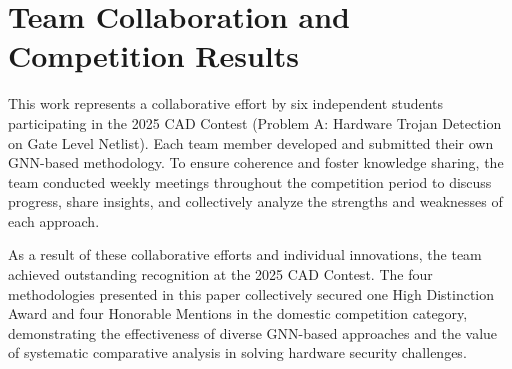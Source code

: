\documentclass[conference]{IEEEtran}
\begin{document}
\section*{Team Collaboration and Competition Results}
This work represents a collaborative effort by six independent students participating in the 2025 CAD Contest (Problem A: Hardware Trojan Detection on Gate Level Netlist). Each team member developed and submitted their own GNN-based methodology. To ensure coherence and foster knowledge sharing, the team conducted weekly meetings throughout the competition period to discuss progress, share insights, and collectively analyze the strengths and weaknesses of each approach.

As a result of these collaborative efforts and individual innovations, the team achieved outstanding recognition at the 2025 CAD Contest. The four methodologies presented in this paper collectively secured one High Distinction Award and four Honorable Mentions in the domestic competition category, demonstrating the effectiveness of diverse GNN-based approaches and the value of systematic comparative analysis in solving hardware security challenges.




\end{document}
